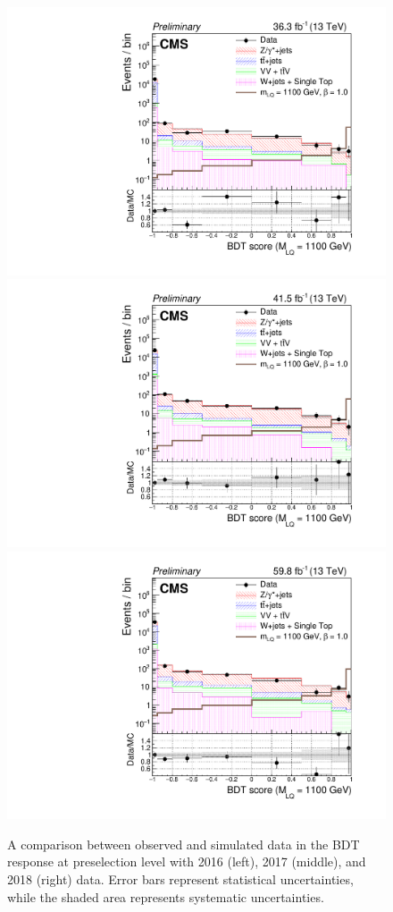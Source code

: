 \begin{figure}[H]
    {\includegraphics[width=.32\textwidth]{Images/Analysis/Results_2016_Unblinded/Plots/Preselection/BasicLQ_uujj_LQToBMu_pair_uubj_BDT_discrim_M1100_standard.pdf}}
    {\includegraphics[width=.32\textwidth]{Images/Analysis/Results_2017_Unblinded/Plots/Preselection/BasicLQ_uujj_LQToBMu_pair_uubj_BDT_discrim_M1100_standard.pdf}}
    {\includegraphics[width=.32\textwidth]{Images/Analysis/Results_2018_Unblinded/Plots/Preselection/BasicLQ_uujj_LQToBMu_pair_uubj_BDT_discrim_M1100_standard.pdf}}
    \caption{A comparison between observed and simulated data in the BDT response at preselection level with 2016 (left), 2017 (middle), and 2018 (right) data. Error bars represent statistical uncertainties, while the shaded area represents systematic uncertainties.}
    \label{figapp:BDT900to1100}
\end{figure}

